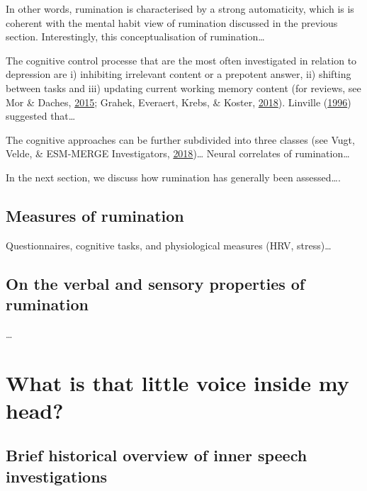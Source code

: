 \documentclass[a4paper,12pt,twoside,openright,oldfontcommands]{memoir}
\begin{document}
In other words, rumination is characterised by a strong automaticity, which is is coherent with the mental habit view of rumination discussed in the previous section. Interestingly, this conceptualisation of rumination\ldots{}

The cognitive control processe that are the most often investigated in relation to depression are i) inhibiting irrelevant content or a prepotent answer, ii) shifting between tasks and iii) updating current working memory content (for reviews, see Mor \& Daches, \protect\hyperlink{ref-mor_ruminative_2015}{2015}; Grahek, Everaert, Krebs, \& Koster, \protect\hyperlink{ref-grahek_cognitive_2018}{2018}). Linville (\protect\hyperlink{ref-linville_attention_1996}{1996}) suggested that\ldots{}

The cognitive approaches can be further subdivided into three classes (see Vugt, Velde, \& ESM-MERGE Investigators, \protect\hyperlink{ref-van_vugt_how_2018}{2018})\ldots{} Neural correlates of rumination\ldots{}

In the next section, we discuss how rumination has generally been assessed\ldots.

\hypertarget{measures-of-rumination}{%
\subsection{Measures of rumination}\label{measures-of-rumination}}

Questionnaires, cognitive tasks, and physiological measures (HRV, stress)\ldots{}

\hypertarget{on-the-verbal-and-sensory-properties-of-rumination}{%
\subsection{On the verbal and sensory properties of rumination}\label{on-the-verbal-and-sensory-properties-of-rumination}}

\ldots{}

\hypertarget{what-is-that-little-voice-inside-my-head}{%
\section{What is that little voice inside my head?}\label{what-is-that-little-voice-inside-my-head}}

\hypertarget{brief-historical-overview-of-inner-speech-investigations}{%
\subsection{Brief historical overview of inner speech investigations}\label{brief-historical-overview-of-inner-speech-investigations}}
\end{document}
